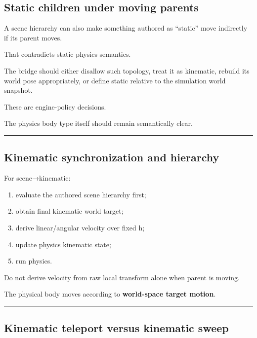 \subsection{Static children under moving parents}\label{06-engine-ii-ch038-static-children-under-moving-parents}

A scene hierarchy can also make something authored as ``static'' move indirectly if its parent moves.

That contradicts static physics semantics.

The bridge should either disallow such topology, treat it as kinematic, rebuild its world pose appropriately, or define static relative to the simulation world snapshot.

These are engine-policy decisions.

The physics body type itself should remain semantically clear.

\begin{center}\rule{0.5\linewidth}{0.5pt}\end{center}

\subsection{Kinematic synchronization and hierarchy}\label{06-engine-ii-ch038-kinematic-synchronization-and-hierarchy}

For scene→kinematic:

\begin{enumerate}
\def\labelenumi{\arabic{enumi}.}
\tightlist
\item
  evaluate the authored scene hierarchy first;
\item
  obtain final kinematic world target;
\item
  derive linear/angular velocity over fixed h;
\item
  update physics kinematic state;
\item
  run physics.
\end{enumerate}

Do not derive velocity from raw local transform alone when parent is moving.

The physical body moves according to \textbf{world-space target motion}.

\begin{center}\rule{0.5\linewidth}{0.5pt}\end{center}

\subsection{Kinematic teleport versus kinematic sweep}\label{06-engine-ii-ch038-kinematic-teleport-versus-kinematic-sweep}

